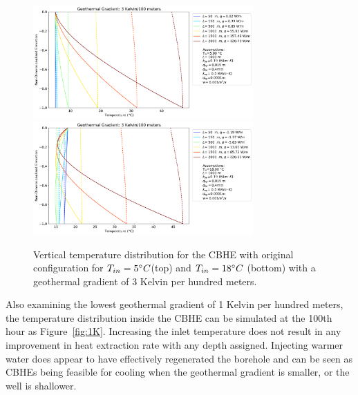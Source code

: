	    \begin{figure}[h!]
	        \centering
	        \includegraphics[width=0.75\textwidth]{depths_5_3k_Tin5_w3.png}
	        \includegraphics[width=0.75\textwidth]{depths_5_3k_Tin18_w3.png}
	        \caption{Vertical temperature distribution for the CBHE with original configuration for $T_{in} = 5\degree C$(top) and $T_{in} = 18\degree C$ (bottom) with a geothermal gradient of 3 Kelvin per hundred meters.}
	        \label{fig:3K}
	    \end{figure}
	    
		Also examining the lowest geothermal gradient of 1 Kelvin per hundred meters, the temperature distribution inside the CBHE can be simulated at the 100th hour as Figure~\ref{fig:1K}. Increasing the inlet temperature does not result in any improvement in heat extraction rate with any depth assigned. Injecting warmer water does appear to have effectively regenerated the borehole and can be seen as CBHEs being feasible for cooling when the geothermal gradient is smaller, or the well is shallower.
	        
